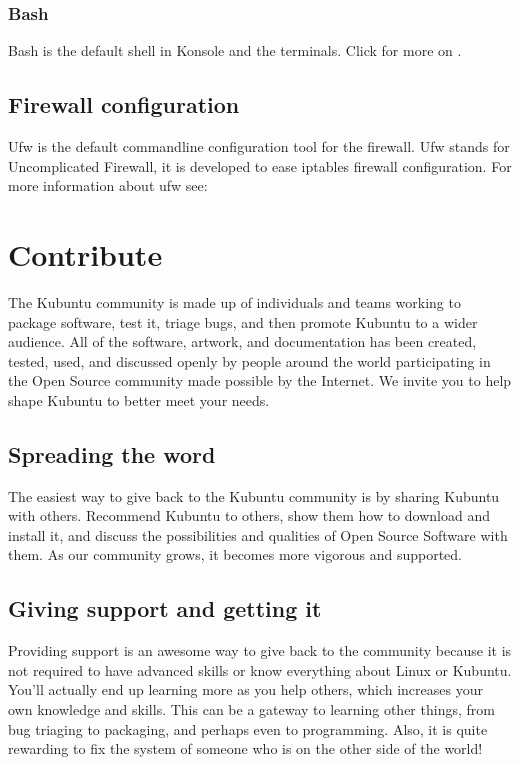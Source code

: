 \documentclass[letterpaper,10pt,english]{sphinxmanual}
\begin{document}
\subsection{Bash}
\label{\detokenize{docs/software:bash}}
\sphinxAtStartPar
Bash is the default shell in Konsole and the terminals. Click for more on .


\section{Firewall configuration}
\label{\detokenize{docs/software:firewall-configuration}}
\sphinxAtStartPar
Ufw is the default commandline configuration tool for the firewall. Ufw stands for Uncomplicated Firewall, it is developed to ease iptables firewall configuration. For more information about ufw see: 


\chapter{Contribute}
\label{\detokenize{docs/contribute:contribute}}\label{\detokenize{docs/contribute:contribute-link}}\label{\detokenize{docs/contribute::doc}}
\sphinxAtStartPar
The Kubuntu community is made up of individuals and teams working to package software, test it, triage bugs, and then promote Kubuntu to a wider audience. All of the software, artwork, and documentation has been created, tested, used, and discussed openly by people around the world participating in the Open Source community made possible by the Internet. We invite you to help shape Kubuntu to better meet your needs.


\section{Spreading the word}
\label{\detokenize{docs/contribute:spreading-the-word}}
\sphinxAtStartPar
The easiest way to give back to the Kubuntu community is by sharing Kubuntu with others. Recommend Kubuntu to others, show them how to download and install it, and discuss the possibilities and qualities of Open Source Software with them. As our community grows, it becomes more vigorous and supported.


\section{Giving support and getting it}
\label{\detokenize{docs/contribute:giving-support-and-getting-it}}
\sphinxAtStartPar
Providing support is an awesome way to give back to the community because it is not required to have advanced skills or know everything about Linux or Kubuntu. You’ll actually end up learning more as you help others, which increases your own knowledge and skills. This can be a gateway to learning other things, from bug triaging to packaging, and perhaps even to programming. Also, it is quite rewarding to fix the system of someone who is on the other side of the world!
\end{document}
